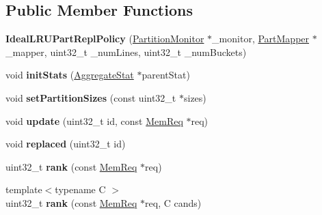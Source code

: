 \subsection*{Public Member Functions}
\begin{DoxyCompactItemize}
\item 
\hypertarget{classIdealLRUPartReplPolicy_a76f9677a013029f467ae6289b9bb51af}{{\bfseries Ideal\-L\-R\-U\-Part\-Repl\-Policy} (\hyperlink{classPartitionMonitor}{Partition\-Monitor} $\ast$\-\_\-monitor, \hyperlink{classPartMapper}{Part\-Mapper} $\ast$\-\_\-mapper, uint32\-\_\-t \-\_\-num\-Lines, uint32\-\_\-t \-\_\-num\-Buckets)}\label{classIdealLRUPartReplPolicy_a76f9677a013029f467ae6289b9bb51af}

\item 
\hypertarget{classIdealLRUPartReplPolicy_a005d5fcb68c06b418eb0ccebcebcd833}{void {\bfseries init\-Stats} (\hyperlink{classAggregateStat}{Aggregate\-Stat} $\ast$parent\-Stat)}\label{classIdealLRUPartReplPolicy_a005d5fcb68c06b418eb0ccebcebcd833}

\item 
\hypertarget{classIdealLRUPartReplPolicy_acf0338dd7fa8e41ba79f1941aa60a67c}{void {\bfseries set\-Partition\-Sizes} (const uint32\-\_\-t $\ast$sizes)}\label{classIdealLRUPartReplPolicy_acf0338dd7fa8e41ba79f1941aa60a67c}

\item 
\hypertarget{classIdealLRUPartReplPolicy_a8d1da4cc3170f608737c400221114ac5}{void {\bfseries update} (uint32\-\_\-t id, const \hyperlink{structMemReq}{Mem\-Req} $\ast$req)}\label{classIdealLRUPartReplPolicy_a8d1da4cc3170f608737c400221114ac5}

\item 
\hypertarget{classIdealLRUPartReplPolicy_a9c5af0e93e754830f267fa9a5e81967c}{void {\bfseries replaced} (uint32\-\_\-t id)}\label{classIdealLRUPartReplPolicy_a9c5af0e93e754830f267fa9a5e81967c}

\item 
\hypertarget{classIdealLRUPartReplPolicy_a1b346d9edf01a4b38720782ef261ebba}{uint32\-\_\-t {\bfseries rank} (const \hyperlink{structMemReq}{Mem\-Req} $\ast$req)}\label{classIdealLRUPartReplPolicy_a1b346d9edf01a4b38720782ef261ebba}

\item 
\hypertarget{classIdealLRUPartReplPolicy_ae8d8a5ab116569a643ff191bb4848a59}{{\footnotesize template$<$typename C $>$ }\\uint32\-\_\-t {\bfseries rank} (const \hyperlink{structMemReq}{Mem\-Req} $\ast$req, C cands)}\label{classIdealLRUPartReplPolicy_ae8d8a5ab116569a643ff191bb4848a59}

\end{DoxyCompactItemize}
